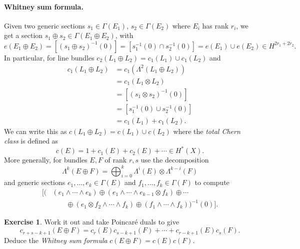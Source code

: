\documentclass{article}
\theoremstyle{definition}
\newtheorem*{exercise}{Exercise}
\begin{document}
\paragraph{Whitney sum formula.}
Given two generic sections $s_1\in\Gamma(E_1)$, $s_2\in\Gamma(E_2)$ where $E_i$
has rank $r_i$, we get a section $s_1\oplus s_2\in\Gamma(E_1\oplus E_2)$, with
\begin{equation*}
    e(E_1\oplus E_2)
        = [(s_1\oplus s_2)^{-1}(0)]
        = [s_1^{-1}(0)\cap s_2^{-1}(0)]
        = e(E_1)\cup e(E_2) \in H^{2r_1+2r_2}.
\end{equation*}
In particular, for line bundles
$c_2(L_1\oplus L_2)=c_1(L_1)\cup c_1(L_2)$ and
\begin{align*}
    c_1(L_1\oplus L_2)
        &= c_1(\Lambda^2(L_1\oplus L_2)) \\
        &= c_1(L_1\otimes L_2) \\
        &= [(s_1\otimes s_2)^{-1}(0)] \\
        &= [s_1^{-1}(0)\cup s_2^{-1}(0)] \\
        &= c_1(L_1) + c_1(L_2).
\end{align*}
We can write this as $c(L_1\oplus L_2)=c(L_1)\cup c(L_2)$ where the
\emph{total Chern class} is defined as
\begin{equation*}
    c(E)=1+c_1(E)+c_2(E)+\cdots\in H^*(X).
\end{equation*}
More generally, for bundles $E,F$ of rank $r,s$ use the decomposition
\begin{equation*}
    \Lambda^k(E\oplus F) = \bigoplus_{i=0}^k\Lambda^i(E)\otimes\Lambda^{k-i}(F)
\end{equation*}
and generic sections $e_1,\ldots,e_k\in\Gamma(E)$ and
$f_1,\ldots,f_k\in\Gamma(F)$ to compute
\begin{align*}
    \bigl[\bigl(&(e_1\wedge\cdots\wedge e_k)
        \oplus(e_1\wedge\cdots\wedge e_{k-1}\otimes f_k)
        \oplus\cdots \\
           &\qquad\oplus(e_1\otimes f_2\wedge\cdots\wedge f_k)
           \oplus(f_1\wedge\cdots\wedge f_k)
       \bigr)^{-1}(0)\bigr].
\end{align*}

\begin{exercise}
    Work it out and take Poincar\'e duals to give
    \begin{equation*}
        c_{r+s-k+1}(E\oplus F)
            = c_r(E)c_{s-k+1}(F) + \cdots + c_{r-k+1}(E)c_s(F).
    \end{equation*}
    Deduce the \emph{Whitney sum formula} $c(E\oplus F)=c(E)c(F)$.
\end{exercise}
\end{document}
